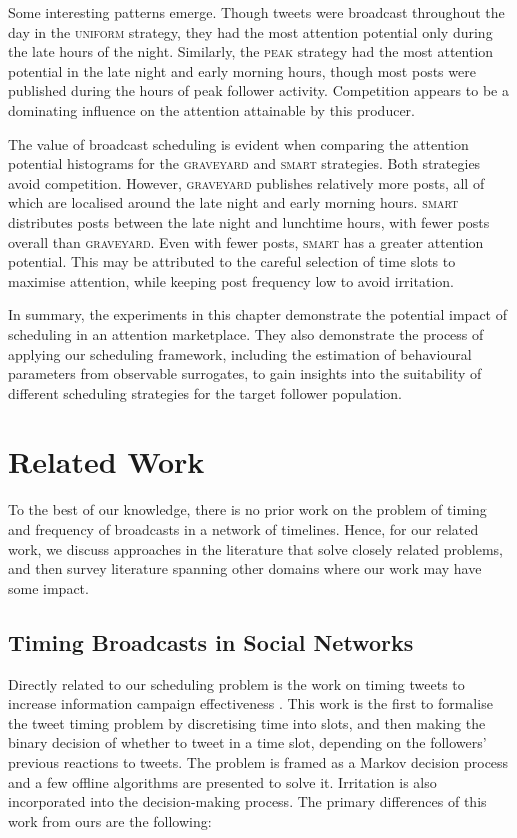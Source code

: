\documentclass[onecolumn, 12 pt, doublespace, fullpage, letterpaper]{report}
\begin{document}
Some interesting patterns emerge. Though tweets were broadcast throughout the day in the \textsc{uniform} strategy, they had the most attention potential only during the late hours of the night. Similarly, the \textsc{peak} strategy had the most attention potential in the late night and early morning hours, though most posts were published during the hours of peak follower activity. Competition appears to be a dominating influence on the attention attainable by this producer.

The value of broadcast scheduling is evident when comparing the attention potential histograms for the \textsc{graveyard} and \textsc{smart} strategies. Both strategies avoid competition. However, \textsc{graveyard} publishes relatively more posts, all of which are localised around the late night and early morning hours. \textsc{smart} distributes posts between the late night and lunchtime hours, with fewer posts overall than \textsc{graveyard}. Even with fewer posts, \textsc{smart} has a greater attention potential. This may be attributed to the careful selection of time slots to maximise attention, while keeping post frequency low to avoid irritation.

In summary, the experiments in this chapter demonstrate the potential impact of scheduling in an attention marketplace. They also demonstrate the process of applying our scheduling framework, including the estimation of behavioural parameters from observable surrogates, to gain insights into the suitability of different scheduling strategies for the target follower population.

\chapter{Related Work}
\label{ch:related-work}

To the best of our knowledge, there is no prior work on the problem of timing and frequency of broadcasts in a network of timelines. Hence, for our related work, we discuss approaches in the literature that solve closely related problems, and then survey literature spanning other domains where our work may have some impact.

\section{Timing Broadcasts in Social Networks}

Directly related to our scheduling problem is the work on timing tweets to increase information campaign effectiveness \cite{dabeer2011timing}. This work is the first to formalise the tweet timing problem by discretising time into slots, and then making the binary decision of whether to tweet in a time slot, depending on the followers' previous reactions to tweets. The problem is framed as a Markov decision process and a few offline algorithms are presented to solve it. Irritation is also incorporated into the decision-making process. The primary differences of this work from ours are the following:
\end{document}

